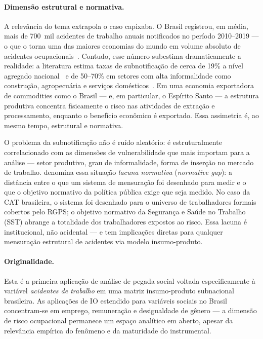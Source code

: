 \documentclass[12pt, a4paper]{article}
\begin{document}
\paragraph{Dimensão estrutural e normativa.}
A relevância do tema extrapola o caso capixaba. O Brasil registrou,
em média, mais de 700~mil acidentes de trabalho anuais notificados no
período 2010--2019 --- o que o torna uma das maiores economias do mundo
em volume absoluto de acidentes ocupacionais~\citep{chagas2011saude}.
Contudo, esse número subestima dramaticamente a realidade: a literatura
estima taxas de subnotificação de cerca de 19\% a nível agregado
nacional~\citep{inss2022subnotificacao} e de 50--70\% em setores com
alta informalidade como construção, agropecuária e serviços
domésticos~\citep{wunsch2004perfil,cordeiro2005underreporting}.
Em uma economia exportadora de commodities como o Brasil --- e,
em particular, o Espírito Santo --- a estrutura produtiva concentra
fisicamente o risco nas atividades de extração e processamento,
enquanto o benefício econômico é exportado. Essa assimetria é, ao
mesmo tempo, estrutural e normativa.

O problema da subnotificação não é ruído aleatório: é estruturalmente
correlacionado com as dimensões de vulnerabilidade que mais importam
para a análise --- setor produtivo, grau de informalidade, forma de
inserção no mercado de trabalho. \citet{hitzig2020normative} denomina
essa situação \textit{lacuna normativa} (\textit{normative gap}): a
distância entre o que um sistema de mensuração foi desenhado para medir
e o que o objetivo normativo da política pública exige que seja medido.
No caso da CAT brasileira, o sistema foi desenhado para o universo de
trabalhadores formais cobertos pelo RGPS; o objetivo normativo da
Segurança e Saúde no Trabalho (SST) abrange a totalidade dos
trabalhadores expostos ao risco. Essa lacuna é institucional,
não acidental --- e tem implicações diretas para qualquer mensuração
estrutural de acidentes via modelo insumo-produto.

\paragraph{Originalidade.}
Esta é a primeira aplicação de análise de pegada social voltada
especificamente à variável \textit{acidentes de trabalho} em uma matriz
insumo-produto subnacional brasileira. As aplicações de IO estendido
para variáveis sociais no Brasil concentram-se em emprego, remuneração
e desigualdade de gênero --- a dimensão de risco ocupacional permanece
um espaço analítico em aberto, apesar da relevância empírica do fenômeno
e da maturidade do instrumental.
\end{document}
